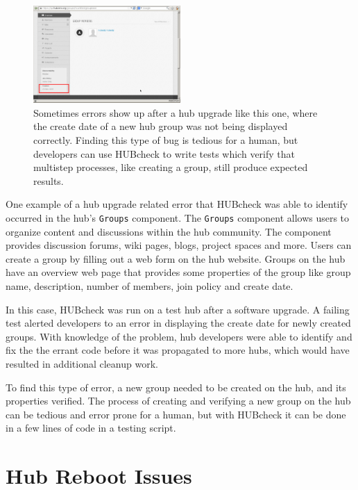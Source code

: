 \begin{figure}[ht]
  \centering
  \includegraphics[width=0.5\textwidth]
    {../../images/eps/qahubzero_v1_2_group_create_date_bad_year.pdf}
  \caption{ Sometimes errors show up after a hub upgrade like this one, where
            the create date of a new hub group was not being displayed correctly.
            Finding this type of bug is tedious for a human, but developers
            can use HUBcheck to write tests which verify that multistep processes,
            like creating a group, still produce expected results.}
  \label{fig:group_create_date_bad_year}
\end{figure}


One example of a hub upgrade related error that HUBcheck was able to identify
occurred in the hub's \texttt{Groups} component. The \texttt{Groups} component
allows users to organize content and discussions within the hub community. The
component provides discussion forums, wiki pages, blogs, project spaces and
more. Users can create a group by filling out a web form on the hub website.
Groups on the hub have an overview web page that provides some properties of
the group like group name, description, number of members, join policy and
create date.

In this case, HUBcheck was run on a test hub after a software upgrade. A
failing test alerted developers to an error in displaying the create date for
newly created groups.  With knowledge of the problem, hub developers were able
to identify and fix the the errant code before it was propagated to more
hubs, which would have resulted in additional cleanup work.

To find this type of error, a new group needed to be created on the hub, and
its properties verified. The process of creating and verifying a new group on
the hub can be tedious and error prone for a human, but with HUBcheck it can be
done in a few lines of code in a testing script.


\section{Hub Reboot Issues}
\label{sec:problem_reboot}

